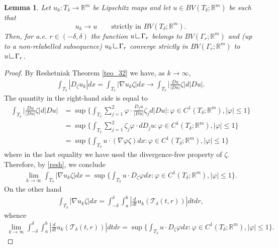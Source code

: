\documentclass[a4paper,11pt]{article}
\numberwithin{equation}{section}
\newtheorem{lemma}[theorem]{Lemma}
\def\div{\,{\rm div\ }}
\newcommand{\R}{\mathbb{R}}
\newcommand{\res}      {\mathop{\hbox{\vrule height 7pt width .5pt depth
                        0pt\vrule height .5pt width 6pt depth 0pt}}\nolimits}
\begin{document}
\begin{lemma}\label{lemma_coareaBV}
Let $u_k:T_\delta\rightarrow \R^m$ be Lipschitz maps and let $u\in BV(T_\delta;\R^m)$ be such that 
$$u_k\rightarrow u\qquad \text{strictly in }BV(T_\delta;\R^m).$$
Then, for  a.e. $r\in(-\delta,\delta)$ the function $u\res \Gamma_r$ belongs to $BV(\Gamma_r;\R^m)$ and (up to a non-relabelled subsequence) $u_k\res\Gamma_r$ converge strictly in $BV(\Gamma_r;\R^m)$ to $u\res \Gamma_r$.
\end{lemma}
\begin{proof}

By Reshetniak Theorem \ref{teo_32} we have, as $k\rightarrow\infty$,
\begin{align}\label{resh}
	\int_{T_\delta}|D_\zeta u_k|dx=
\int_{T_\delta}|\nabla u_k\zeta|dx\rightarrow \int_{T_\delta}\Big|\frac{Du}{|Du|} \zeta\Big|d|Du|.
\end{align}
The quantity in the right-hand side is equal to
\begin{align*}
\int_{T_\delta}\Big|\frac{Du}{|Du|} \zeta\Big|d|Du|&=\sup\{\int_{T_\delta}\sum_{j=1}^2\varphi\cdot\frac{D_ju}{|Du|}\zeta_j  d|Du|:\varphi\in C^1(T_\delta;\R^m),|\varphi|\leq 1\}\\
&=\sup\{\int_{T_\delta}\sum_{j=1}^2\zeta_j \varphi\cdot dD_ju:\varphi\in C^1(T_\delta;\R^m),|\varphi|\leq 1\}\\
	&=\sup\{\int_{T_\delta}u\cdot (\nabla\varphi\zeta) dx:\varphi\in C^1(T_\delta;\R^m),|\varphi|\leq 1\}
\end{align*}
where in the last equality we have used the divergence-free property of $\zeta$.
Therefore, by \eqref{resh}, we conclude
\begin{align}
\lim_{k\rightarrow \infty}\int_{T_\delta}|\nabla u_k\zeta|dx=\sup\{\int_{T_\delta}u \cdot D_\zeta\varphi dx:\varphi\in C^1(T_\delta;\R^m),|\varphi|\leq 1\}.
\end{align}
On the other hand 
\begin{align*}
\int_{T_\delta}|\nabla u_k\zeta|dx=\int_{-\delta}^\delta\int_{a}^b|\frac{d}{dt}u_k(\mathcal T_\delta(t,r))|dtdr,
\end{align*}
whence
\begin{align}\label{STRICT}
\lim_{k\rightarrow \infty}\int_{-\delta}^\delta\int_{a}^b|\frac{d}{dt}u_k(\mathcal T_\delta(t,r))|dtdr=\sup\{\int_{T_\delta}u\cdot D_\zeta\varphi dx:\varphi\in C^1(T_\delta;\R^m),|\varphi|\leq 1\}.

\end{align}
\end{proof}
\end{document}
